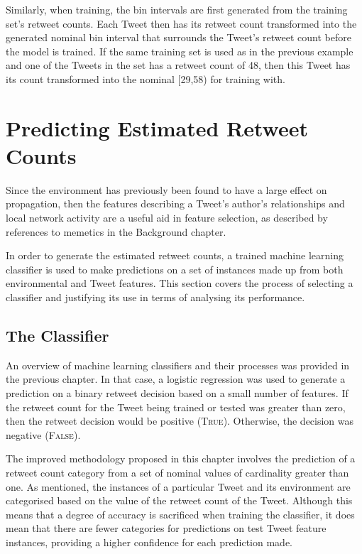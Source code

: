 Similarly, when training, the bin intervals are first generated from the training set's retweet counts. Each Tweet then has its retweet count transformed into the generated nominal bin interval that surrounds the Tweet's retweet count before the model is trained. If the same training set is used as in the previous example and one of the Tweets in the set has a retweet count of 48, then this Tweet has its count transformed into the nominal {[29,58)} for training with.
 

\section{Predicting Estimated Retweet Counts}
Since the environment has previously been found to have a large effect on propagation, then the features describing a Tweet's author's relationships and local network activity  are a useful aid in feature selection, as described by references to memetics in the Background chapter. 
 
In order to generate the estimated retweet counts, a trained machine learning classifier is used to make predictions on a set of instances made up from both environmental and Tweet features. This section covers the process of selecting a classifier and justifying its use in terms of analysing its performance.


\subsection{The Classifier}
An overview of machine learning classifiers and their processes was provided in the previous chapter. In that case, a logistic regression was used to generate a prediction on a binary retweet decision based on a small number of features. If the retweet count for the Tweet being trained or tested was greater than zero, then the retweet decision would be positive (\textsc{True}). Otherwise, the decision was negative (\textsc{False}).

The improved methodology proposed in this chapter involves the prediction of a retweet count category from a set of nominal values of cardinality greater than one. As mentioned, the instances of a particular Tweet and its environment are categorised based on the value of the retweet count of the Tweet. Although this means that a degree of accuracy is sacrificed when training the classifier, it does mean that there are fewer categories for predictions on test Tweet feature instances, providing a higher confidence for each prediction made.

